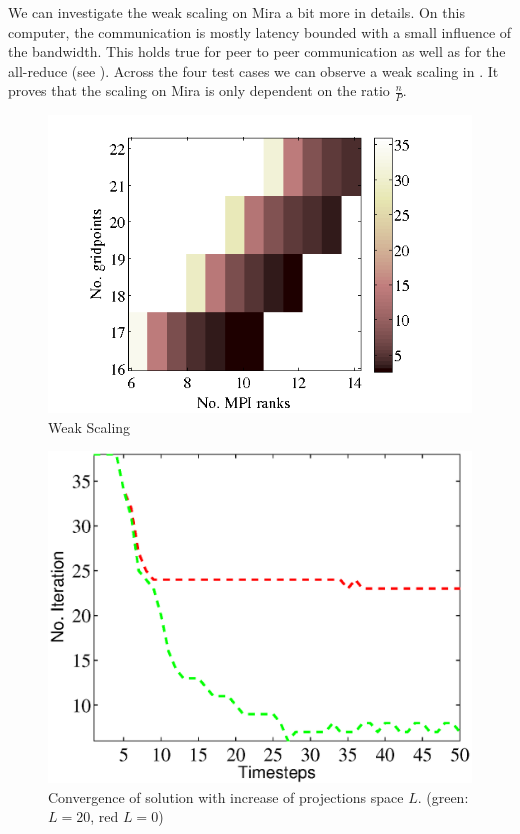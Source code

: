 \documentclass{sig-alternate}
\begin{document}
We can investigate the weak scaling on Mira a bit more in details. On this computer, the communication is mostly latency bounded with a small influence of the
bandwidth. This holds true for peer to peer communication as well as for the
all-reduce (see ). Across the four test cases we can observe a weak scaling in
. It proves that the scaling on Mira is only dependent
on the ratio $\frac{n}{P}$. 
\begin{figure}
  \centering
  \includegraphics[width=\linewidth]{./figures/weak.png}
  \caption{Weak Scaling}
  \label{fig:weakscaling}
\end{figure}

\begin{figure}
  \centering
  \includegraphics[width=\linewidth]{./figures/projections.eps}
  \caption{Convergence of solution with increase of projections space $L$. (green: $L=20$, red $L=0$) }
  \label{fig:projections}
\end{figure}
\end{document}
